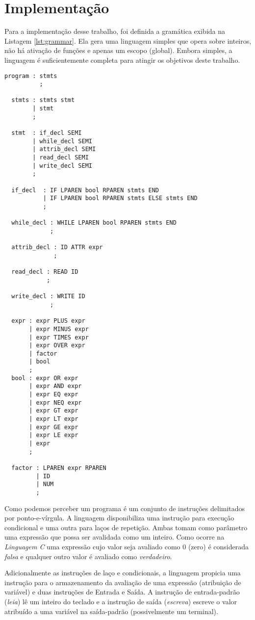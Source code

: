 \section{Implementação}
\label{sec:implementacao}

Para a implementação desse trabalho, foi definida a gramática exibida na
Listagem \ref{lst:grammar}. Ela gera uma linguagem simples que opera sobre
inteiros, não há ativação de funções e apenas um escopo (global).
Embora simples, a linguagem é suficientemente completa para atingir os
objetivos deste trabalho.

\begin{lstlisting}[label=lst:grammar,caption=Gramática reconhecida]
  program : stmts
          ;

  stmts : stmts stmt
        | stmt
        ;

  stmt  : if_decl SEMI
        | while_decl SEMI
        | attrib_decl SEMI
        | read_decl SEMI
        | write_decl SEMI
        ;

  if_decl  : IF LPAREN bool RPAREN stmts END
           | IF LPAREN bool RPAREN stmts ELSE stmts END
           ;

  while_decl : WHILE LPAREN bool RPAREN stmts END
             ;

  attrib_decl : ID ATTR expr
              ;

  read_decl : READ ID
            ;

  write_decl : WRITE ID
             ;

  expr : expr PLUS expr
       | expr MINUS expr
       | expr TIMES expr
       | expr OVER expr
       | factor
       | bool
       ;
  bool : expr OR expr
       | expr AND expr
       | expr EQ expr
       | expr NEQ expr
       | expr GT expr
       | expr LT expr
       | expr GE expr
       | expr LE expr
       | expr
       ;

  factor : LPAREN expr RPAREN
         | ID
         | NUM
         ;
\end{lstlisting}

Como podemos perceber um programa é um conjunto de instruções delimitados por
ponto-e-vírgula. A linguagem disponibiliza uma instrução para execução
condicional e uma outra para laços de repetição. Ambas tomam como parâmetro
uma expressão que possa ser avalidada como um inteiro. Como ocorre na
\emph{Linguagem C} uma expressão cujo valor seja avaliado como 0 (zero) é
considerada \emph{falsa} e qualquer outro valor é avaliado como
\emph{verdadeiro}.

Adicionalmente as instruções de laço e condicionais, a linguagem propicia uma
instrução para o armazenamento da avaliação de uma expressão (atribuição de
variável) e duas instruções de Entrada e Saída. A instrução de entrada-padrão
(\emph{leia}) lê um inteiro do teclado e a instrução de saída (\emph{escreva})
escreve o valor atribuído a uma variável na saída-padrão (possivelmente um
terminal).

